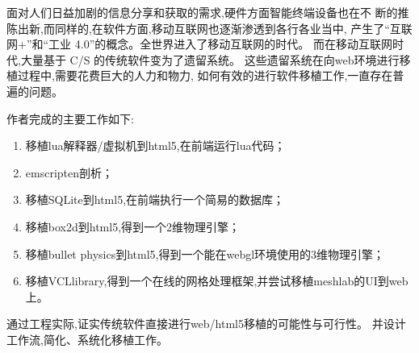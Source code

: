 
\begin{cabstract}
面对人们日益加剧的信息分享和获取的需求,硬件方面智能终端设备也在不
断的推陈出新,而同样的,在软件方面,移动互联网也逐渐渗透到各行各业当中,
产生了“互联网+”和“工业 4.0”的概念。全世界进入了移动互联网的时代。
而在移动互联网时代,大量基于 C/S 的传统软件变为了遗留系统。
这些遗留系统在向web环境进行移植过程中,需要花费巨大的人力和物力,
如何有效的进行软件移植工作,一直存在普遍的问题。

\par
作者完成的主要工作如下:

\begin{enumerate}[itemindent=2em]
    \item 移植lua解释器/虚拟机到html5,在前端运行lua代码；
    \item emscripten剖析；
    \item 移植SQLite到html5,在前端执行一个简易的数据库；
    \item 移植box2d到html5,得到一个2维物理引擎；
    \item 移植bullet physics到html5,得到一个能在webgl环境使用的3维物理引擎；
    \item 移植VCLlibrary,得到一个在线的网格处理框架,并尝试移植meshlab的UI到web上。
\end{enumerate}

\par
通过工程实际,证实传统软件直接进行web/html5移植的可能性与可行性。
并设计工作流,简化、系统化移植工作。

\end{cabstract}

